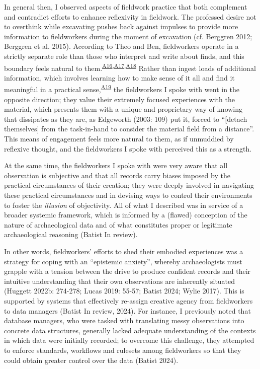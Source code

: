 \documentclass[
]{article}
\begin{document}
In general then, I observed aspects of fieldwork practice that both
complement and contradict efforts to enhance reflexivity in fieldwork.
The professed desire not to overthink while excavating pushes back
against impulses to provide more information to fieldworkers during the
moment of excavation (cf. Berggren 2012; Berggren et al. 2015).
According to Theo and Ben, fieldworkers operate in a strictly separate
role than those who interpret and write about finds, and this boundary
feels natural to
them.\textsuperscript{\hyperref[sec-A16]{A16},\hyperref[sec-A17]{A17},\hyperref[sec-A18]{A18}}
Rather than ingest loads of additional information, which involves
learning how to make sense of it all and find it meaningful in a
practical sense,\textsuperscript{\hyperref[sec-A19]{A19}} the
fieldworkers I spoke with went in the opposite direction; they value
their extremely focused experiences with the material, which presents
them with a unique and proprietary way of knowing that dissipates as
they are, as Edgeworth (2003: 109) put it, forced to ``{[}detach
themselves{]} from the task-in-hand to consider the material field from
a distance''. This means of engagement feels more natural to them, as if
unmuddied by reflexive thought, and the fieldworkers I spoke with
perceived this as a strength.

At the same time, the fieldworkers I spoke with were very aware that all
observation is subjective and that all records carry biases imposed by
the practical circumstances of their creation; they were deeply involved
in navigating these practical circumstances and in devising ways to
control their environments to foster the \emph{illusion} of objectivity.
All of what I described was in service of a broader systemic framework,
which is informed by a (flawed) conception of the nature of
archaeological data and of what constitutes proper or legitimate
archaeological reasoning (Batist In review).

In other words, fieldworkers' efforts to shed their embodied experiences
was a strategy for coping with an ``epistemic anxiety'', whereby
archaeologists must grapple with a tension between the drive to produce
confident records and their intuitive understanding that their own
observations are inherently situated (Huggett 2022b: 274-278; Lucas
2019: 55-57; Batist 2024; Wylie 2017). This is supported by systems that
effectively re-assign creative agency from fieldworkers to data managers
(Batist In review, 2024). For instance, I previously noted that database
managers, who were tasked with translating messy observations into
concrete data structures, generally lacked adequate understanding of the
contexts in which data were initially recorded; to overcome this
challenge, they attempted to enforce standards, workflows and rulesets
among fieldworkers so that they could obtain greater control over the
data (Batist 2024).
\end{document}
